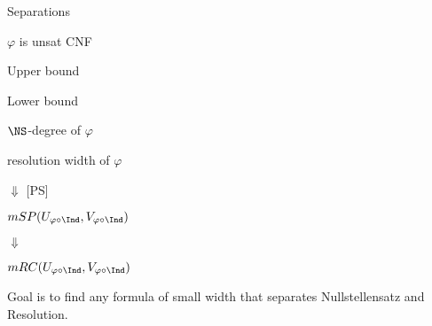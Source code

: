 \begin{frame}{Separations}

    \begin{center}
        $\varphi$ is unsat CNF
	\end{center}

    \begin{minipage}{0.5 \textwidth}
        \centering
        Upper bound
    \end{minipage}%
    \begin{minipage}{0.5 \textwidth}
        \centering
        Lower bound
    \end{minipage}

    \pause
    \vspace{0.4cm}

    \begin{minipage}{0.5 \textwidth}
        \centering
        $\NS$-degree of $\varphi$
    \end{minipage}%
    \begin{minipage}{0.5 \textwidth}
        \centering
        resolution width of $\varphi$
    \end{minipage}

    \pause
    \vspace{0.3cm}

    \begin{minipage}{0.5 \textwidth}
        \centering
        $\Downarrow$ [PS]

        \vspace{0.3cm}

        $mSP(U_{\varphi \circ \Ind}, V_{\varphi \circ \Ind})$
    \end{minipage}%
    \begin{minipage}{0.5 \textwidth}
        \centering
        $\Downarrow$

        \vspace{0.3cm}
        
        $mRC(U_{\varphi \circ \Ind}, V_{\varphi \circ \Ind})$
    \end{minipage}


    \pause
    \vspace{1cm}
    Goal is to find any formula of small width that separates Nullstellensatz and Resolution.

\end{frame}